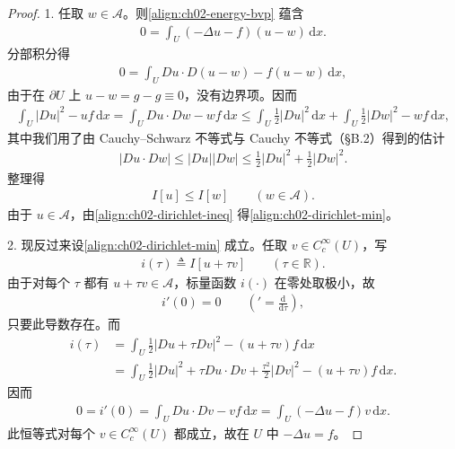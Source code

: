 \documentclass[../../main.tex]{subfiles}
\begin{document}
\begin{proof}
1. 任取 $w\in\mathcal{A}$。则\eqref{align:ch02-energy-bvp} 蕴含
\begin{align*}
0=\int_U(-\Delta u-f)(u-w)\,\mathrm{d}x.
\end{align*}
分部积分得
\begin{align*}
0=\int_U Du\cdot D(u-w)-f(u-w)\,\mathrm{d}x,
\end{align*}
由于在 $\partial U$ 上 $u-w=g-g\equiv 0$，没有边界项。因而
\begin{align*}
\int_U|Du|^2-uf\,\mathrm{d}x=\int_U Du\cdot Dw-wf\,\mathrm{d}x
\leqslant\int_U\frac{1}{2}|Du|^2\,\mathrm{d}x+\int_U\frac{1}{2}|Dw|^2-wf\,\mathrm{d}x,
\end{align*}
其中我们用了由 Cauchy--Schwarz 不等式与 Cauchy 不等式（\S B.2）得到的估计
\begin{align*}
|Du\cdot Dw|\leqslant|Du||Dw|\leqslant\frac{1}{2}|Du|^2+\frac{1}{2}|Dw|^2.
\end{align*}
整理得
\begin{align}\label{align:ch02-dirichlet-ineq}
I[u]\leqslant I[w] \qquad (w\in\mathcal{A}).
\end{align}
由于 $u\in\mathcal{A}$，由\eqref{align:ch02-dirichlet-ineq} 得\eqref{align:ch02-dirichlet-min}。

2. 现反过来设\eqref{align:ch02-dirichlet-min} 成立。任取 $v\in C_c^\infty(U)$，写
\begin{align*}
i(\tau)\triangleq I[u+\tau v] \qquad (\tau\in\mathbb{R}).
\end{align*}
由于对每个 $\tau$ 都有 $u+\tau v\in\mathcal{A}$，标量函数 $i(\cdot)$ 在零处取极小，故
\begin{align*}
i'(0)=0 \qquad \left('=\frac{\mathrm{d}}{\mathrm{d}\tau}\right),
\end{align*}
只要此导数存在。而
\begin{align*}
i(\tau)&=\int_U\frac{1}{2}|Du+\tau Dv|^2-(u+\tau v)f\,\mathrm{d}x\\
&=\int_U\frac{1}{2}|Du|^2+\tau Du\cdot Dv+\frac{\tau^2}{2}|Dv|^2-(u+\tau v)f\,\mathrm{d}x.
\end{align*}
因而
\begin{align*}
0=i'(0)=\int_U Du\cdot Dv-vf\,\mathrm{d}x=\int_U(-\Delta u-f)v\,\mathrm{d}x.
\end{align*}
此恒等式对每个 $v\in C_c^\infty(U)$ 都成立，故在 $U$ 中 $-\Delta u=f$。
\end{proof}
\end{document}
